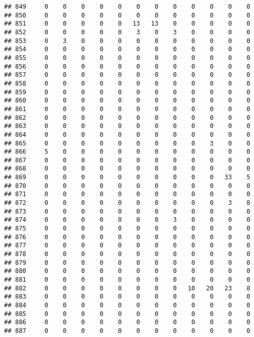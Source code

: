 \documentclass[]{article}
\begin{document}
\begin{verbatim}
## 849     0    0    0    0    0    0    0    0    0    0    0    0
## 850     0    0    0    0    0    0    0    0    0    0    0    0
## 851     0    0    0    0    0   13   13    0    0    0    0    0
## 852     0    0    0    0    0    3    0    3    0    0    0    0
## 853     0    3    0    0    0    0    0    0    0    0    0    0
## 854     0    0    0    0    0    0    0    0    0    0    0    0
## 855     0    0    0    0    0    0    0    0    0    0    0    0
## 856     0    0    0    0    0    0    0    0    0    0    0    0
## 857     0    0    0    0    0    0    0    0    0    0    0    0
## 858     0    0    0    0    0    0    0    0    0    0    0    0
## 859     0    0    0    0    0    0    0    0    0    0    0    0
## 860     0    0    0    0    0    0    0    0    0    0    0    0
## 861     0    0    0    0    0    0    0    0    0    0    0    0
## 862     0    0    0    0    0    0    0    0    0    0    0    0
## 863     0    0    0    0    0    0    0    0    0    0    0    0
## 864     0    0    0    0    0    0    0    0    0    0    0    0
## 865     0    0    0    0    0    0    0    0    0    3    0    0
## 866     5    0    0    0    0    0    0    0    0    0    0    0
## 867     0    0    0    0    0    0    0    0    0    0    0    0
## 868     0    0    0    0    0    0    0    0    0    0    0    0
## 869     0    0    0    0    0    0    0    0    0    0   33    5
## 870     0    0    0    0    0    0    0    0    0    0    0    0
## 871     0    0    0    0    0    0    0    0    0    0    0    0
## 872     0    0    0    0    0    0    0    0    0    0    3    8
## 873     0    0    0    0    0    0    0    0    0    0    0    0
## 874     0    0    0    0    0    0    0    3    0    0    0    0
## 875     0    0    0    0    0    0    0    0    0    0    0    0
## 876     0    0    0    0    0    0    0    0    0    0    0    0
## 877     0    0    0    0    0    0    0    0    0    0    0    0
## 878     0    0    0    0    0    0    0    0    0    0    0    0
## 879     0    0    0    0    0    0    0    0    0    0    0    0
## 880     0    0    0    0    0    0    0    0    0    0    0    0
## 881     0    0    0    0    0    0    0    0    0    0    0    0
## 882     0    0    0    0    0    0    0    0   10   20   23    8
## 883     0    0    0    0    0    0    0    0    0    0    0    0
## 884     0    0    0    0    0    0    0    0    0    0    0    0
## 885     0    0    0    0    0    0    0    0    0    0    0    0
## 886     0    0    0    0    0    0    0    0    0    0    0    0
## 887     0    0    0    0    0    0    0    0    0    0    0    0

\end{verbatim}
\end{document}

